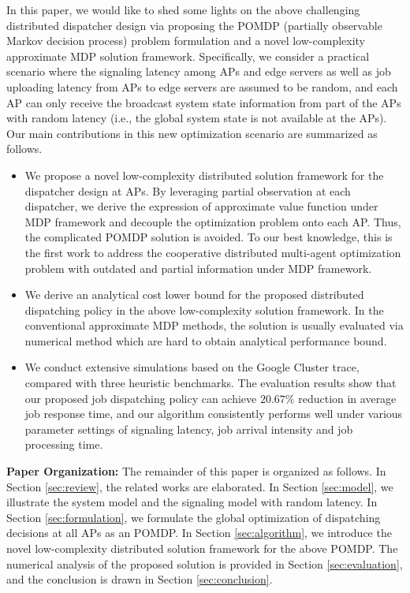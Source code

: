 In this paper, we would like to shed some lights on the above challenging distributed dispatcher design via proposing the POMDP (partially observable Markov decision process) problem formulation and a novel low-complexity approximate MDP solution framework.
Specifically, we consider a practical scenario where the signaling latency among APs and edge servers as well as job uploading latency from APs to edge servers are assumed to be random, and each AP can only receive the broadcast system state information from part of the APs with random latency (i.e., the global system state is not available at the APs).
Our main contributions in this new optimization scenario are summarized as follows.
\begin{itemize}
    \item %
    We propose a novel low-complexity distributed solution framework for the dispatcher design at APs.
    By leveraging partial observation at each dispatcher, we derive the expression of approximate value function under MDP framework and decouple the optimization problem onto each AP.
    Thus, the complicated POMDP solution is avoided.
    To our best knowledge, this is the first work to address the cooperative distributed multi-agent optimization problem with outdated and partial information under MDP framework.
    \item %
    We derive an analytical cost lower bound for the proposed distributed dispatching policy in the above low-complexity solution framework.
    In the conventional approximate MDP methods, the solution is usually evaluated via numerical method which are hard to obtain analytical performance bound.
    \item We conduct extensive simulations based on the Google Cluster trace, compared with three heuristic benchmarks. The evaluation results show that our proposed job dispatching policy can achieve $20.67\%$ reduction in average job response time, and our algorithm consistently performs well under various parameter settings of signaling latency, job arrival intensity and job processing time.
\end{itemize}

\noindent \textbf{Paper Organization: }The remainder of this paper is organized as follows.
In Section \ref{sec:review}, the related works are elaborated.
In Section \ref{sec:model}, we illustrate the system model and the signaling model with random latency.
In Section \ref{sec:formulation}, we formulate the global optimization of dispatching decisions at all APs as an POMDP.
In Section \ref{sec:algorithm}, we introduce the novel low-complexity distributed solution framework for the above POMDP.
The numerical analysis of the proposed solution is provided in Section \ref{sec:evaluation}, and the conclusion is drawn in Section \ref{sec:conclusion}.

